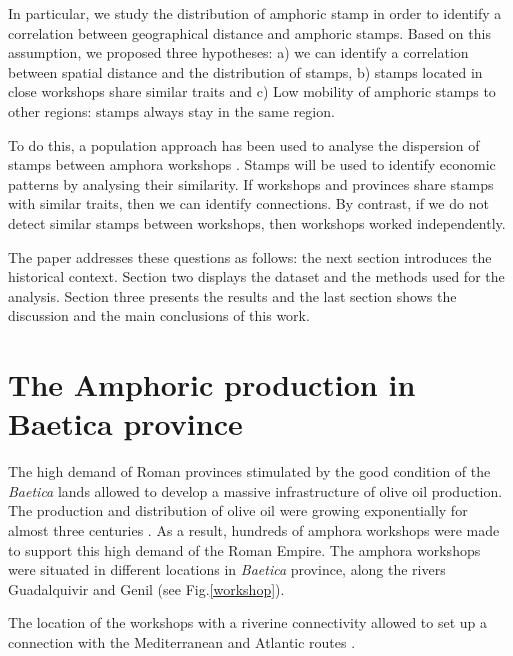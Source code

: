\documentclass[review]{elsarticle}
\newcommand{\memo}[2]{\textcolor{#1}{#2}}
\newcommand{\xavi}[1]{\memo{magenta}{XRC: #1\\}}
\begin{document}
In particular, we study the distribution of amphoric stamp in order to identify a correlation between geographical distance and amphoric stamps. Based on this assumption, we proposed three hypotheses: a) we can identify a correlation between spatial distance and the distribution of stamps, b) stamps located in close workshops share similar traits and c) Low mobility of amphoric stamps to other regions: stamps always stay in the same region.  


To do this, a population approach has been used to analyse the dispersion of stamps between amphora workshops \citep{rubio-campillo_ecology_2018}. Stamps will be used to identify economic patterns by analysing their similarity. If workshops and provinces share stamps with similar traits, then we can identify connections. By contrast, if we do not detect similar stamps between workshops, then workshops worked independently. 


The paper addresses these questions as follows: the next section introduces the historical context. Section two displays the dataset and the methods used for the analysis. Section three presents the results and the last section shows the discussion and the main conclusions of this work. 
 


\section{The Amphoric production in Baetica province}


The high demand of Roman provinces stimulated by the good condition of the \textit{Baetica} lands allowed to develop a massive infrastructure of olive oil production. The production and distribution of olive oil were growing exponentially for almost three centuries \citep{remesal_concierto}. As a result, hundreds of amphora workshops were made to support this high demand of the Roman Empire. The amphora workshops were situated in different locations in \textit{Baetica} province, along the rivers Guadalquivir and Genil (see Fig.\ref{workshop}).

The location of the workshops with a riverine connectivity allowed to set up a connection with the Mediterranean and Atlantic routes \citep{garcia_vargas_enrique_formal_2010}.
\end{document}
